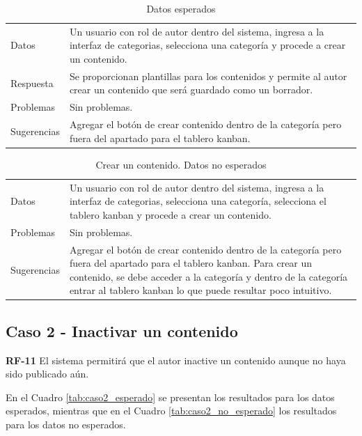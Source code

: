 \documentclass[10pt,times,twocolumn]{article}
\begin{document}
\begin{table}[H]
    \centering
    \begin{tabular}{p{3cm}p{4cm}}
        \rowcolor{gray!15}
        Datos & Un usuario con rol de autor dentro del sistema, ingresa a la interfaz de categorias, selecciona una categoría y procede a crear un contenido. \\
       	Respuesta & Se proporcionan plantillas para los contenidos y permite al autor crear un contenido que será guardado como un borrador. \\
       	Problemas & Sin problemas. \\
       	Sugerencias & Agregar el botón de crear contenido dentro de la categoría pero fuera del apartado para el tablero kanban. \\
    \end{tabular}
    \caption{Datos esperados}
    \label{tab:caso1_esperado}
\end{table}

\begin{table}[H]
    \centering
    \begin{tabular}{p{3cm}p{4cm}}
        \rowcolor{gray!15}
        Datos & Un usuario con rol de autor dentro del sistema, ingresa a la interfaz de categorias, selecciona una categoría, selecciona el tablero kanban y procede a crear un contenido.\\
       	Problemas & Sin problemas. \\
       	Sugerencias & Agregar el botón de crear contenido dentro de la categoría pero fuera del apartado para el tablero kanban. Para crear un contenido, se debe acceder a la categoría y dentro de la categoría entrar al tablero kanban lo que puede resultar poco intuitivo.\\
    \end{tabular}
    \caption{Crear un contenido. Datos no esperados}
    \label{tab:caso1_no_esperado}
\end{table}

\subsection{Caso 2 - Inactivar un contenido}
\textbf{RF-11} El sistema permitirá que el autor inactive un contenido aunque no haya sido publicado aún.

En el Cuadro \ref{tab:caso2_esperado} se presentan los resultados para los datos esperados, mientras que en el Cuadro \ref{tab:caso2_no_esperado} los resultados para los datos no esperados.
\end{document}

